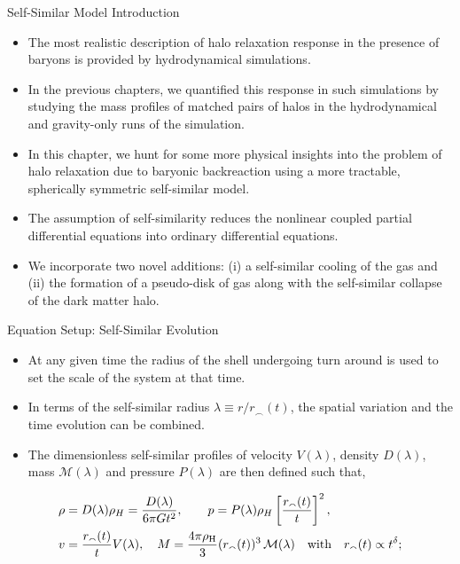 \documentclass[11pt]{beamer}
\begin{document}
\begin{frame}{Self-Similar Model Introduction}
    \begin{itemize}
        \item The most realistic description of halo relaxation response in the presence of baryons is provided by hydrodynamical simulations.
        \item In the previous chapters, we quantified this response in such simulations by studying the mass profiles of matched pairs of halos in the hydrodynamical and gravity-only runs of the simulation.
        \item In this chapter, we hunt for some more physical insights into the problem of halo relaxation due to baryonic backreaction using a more tractable, spherically symmetric self-similar model.
        \item The assumption of self-similarity reduces the nonlinear coupled partial differential equations into ordinary differential equations.
        \item We incorporate two novel additions: (i) a self-similar cooling of the gas and (ii) the formation of a pseudo-disk of gas along with the self-similar collapse of the dark matter halo.
    \end{itemize}
\end{frame}

\begin{frame}{Equation Setup: Self-Similar Evolution}
    \begin{itemize}
        \item At any given time the radius of the shell undergoing turn around is used to set the scale of the system at that time.
        \item In terms of the self-similar radius $\lambda \equiv r/r_{\smallfrown}(t)$, the spatial variation and the time evolution can be combined.
        \item The dimensionless self-similar profiles of velocity $V(\lambda)$, density $D(\lambda)$, mass $\mathcal{M}(\lambda)$ and pressure $P(\lambda)$ are then defined such that,
    \end{itemize}
    \begin{align*}
        \rho &= D(\lambda ) \rho_H = \frac{D(\lambda )}{6 \pi G t^2}, \qquad
        p = P(\lambda ) \rho_H \left[ \frac{r_{\smallfrown}(t)}{t} \right]^2,\\
        v &= \frac{r_{\smallfrown}(t)}{t} V(\lambda ), \quad M = \frac{4\pi \rho _{\rm H}}{3} (r_{\smallfrown}(t))^3\,\mathcal{M}(\lambda)\quad  \text{with} \quad r_{\smallfrown}(t) \propto t^{\delta};
    \end{align*}
\end{frame}
\end{document}
